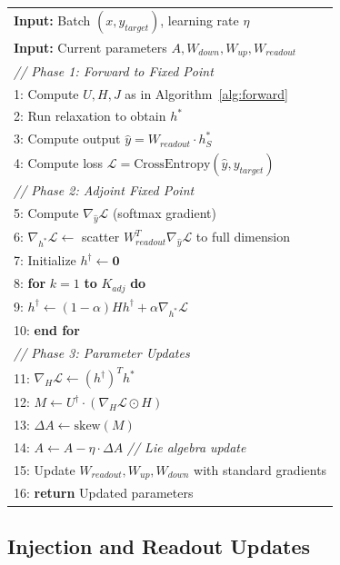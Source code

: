 \documentclass[11pt,a4paper]{article}
\newcommand{\LL}{\mathcal{L}}
\begin{document}
\begin{algorithm}[t]
\caption{Holomorphic Equilibrium Propagation (One Step)}
\label{alg:heqprop}
\begin{tabular}{@{}l@{}}
\textbf{Input:} Batch $(x, y_{target})$, learning rate $\eta$ \\
\textbf{Input:} Current parameters $A, W_{down}, W_{up}, W_{readout}$ \\[0.5em]
\textit{// Phase 1: Forward to Fixed Point} \\
1: Compute $U, H, J$ as in Algorithm~\ref{alg:forward} \\
2: Run relaxation to obtain $h^*$ \\
3: Compute output $\hat{y} = W_{readout} \cdot h^*_S$ \\
4: Compute loss $\LL = \text{CrossEntropy}(\hat{y}, y_{target})$ \\[0.3em]
\textit{// Phase 2: Adjoint Fixed Point} \\
5: Compute $\nabla_{\hat{y}}\LL$ (softmax gradient) \\
6: $\nabla_{h^*}\LL \gets$ scatter $W_{readout}^T \nabla_{\hat{y}}\LL$ to full dimension \\
7: Initialize $h^\dagger \gets \mathbf{0}$ \\
8: \textbf{for} $k = 1$ \textbf{to} $K_{adj}$ \textbf{do} \\
9: \quad $h^\dagger \gets (1-\alpha)H h^\dagger + \alpha \nabla_{h^*}\LL$ \\
10: \textbf{end for} \\[0.3em]
\textit{// Phase 3: Parameter Updates} \\
11: $\nabla_H\LL \gets (h^\dagger)^T h^*$ \\
12: $M \gets U^\dagger \cdot (\nabla_H\LL \odot H)$ \\
13: $\Delta A \gets \text{skew}(M)$ \\
14: $A \gets A - \eta \cdot \Delta A$ \hfill \textit{// Lie algebra update} \\
15: Update $W_{readout}, W_{up}, W_{down}$ with standard gradients \\
16: \textbf{return} Updated parameters \\
\end{tabular}
\end{algorithm}

\subsection{Injection and Readout Updates}
\end{document}
